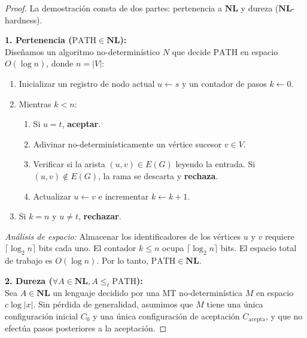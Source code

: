 \documentclass[11pt, a4paper]{article}
\theoremstyle{definition}
\theoremstyle{plain}
\theoremstyle{remark}
\newcommand{\classNL}{\mathbf{NL}}
\newcommand{\PATH}{\text{PATH}}
\newcommand{\leL}{\le_\ell}
\begin{document}
\begin{proof}
La demostración consta de dos partes: pertenencia a $\classNL$ y dureza ($\classNL$-hardness).

\vspace{0.5em}
\noindent\textbf{1. Pertenencia ($\PATH \in \classNL$):}\\
Diseñamos un algoritmo no-determinístico $N$ que decide $\PATH$ en espacio $O(\log n)$, donde $n = |V|$:
\begin{enumerate}
    \item Inicializar un registro de nodo actual $u \leftarrow s$ y un contador de pasos $k \leftarrow 0$.
    \item Mientras $k < n$:
    \begin{enumerate}[label=\roman*.]
        \item Si $u = t$, \textbf{aceptar}.
        \item Adivinar no-determinísticamente un vértice sucesor $v \in V$.
        \item Verificar si la arista $(u, v) \in E(G)$ leyendo la entrada. Si $(u,v) \notin E(G)$, la rama se descarta y \textbf{rechaza}.
        \item Actualizar $u \leftarrow v$ e incrementar $k \leftarrow k + 1$.
    \end{enumerate}
    \item Si $k = n$ y $u \neq t$, \textbf{rechazar}.
\end{enumerate}
\textit{Análisis de espacio:} Almacenar los identificadores de los vértices $u$ y $v$ requiere $\lceil \log_2 n \rceil$ bits cada uno. El contador $k \le n$ ocupa $\lceil \log_2 n \rceil$ bits. El espacio total de trabajo es $O(\log n)$. Por lo tanto, $\PATH \in \classNL$.

\vspace{0.5em}
\noindent\textbf{2. Dureza ($\forall A \in \classNL, A \leL \PATH$):}\\
Sea $A \in \classNL$ un lenguaje decidido por una MT no-determinística $M$ en espacio $c \log |x|$. Sin pérdida de generalidad, asumimos que $M$ tiene una única configuración inicial $C_0$ y una única configuración de aceptación $C_{\text{acepta}}$, y que no efectúa pasos posteriores a la aceptación.


\end{proof}
\end{document}
